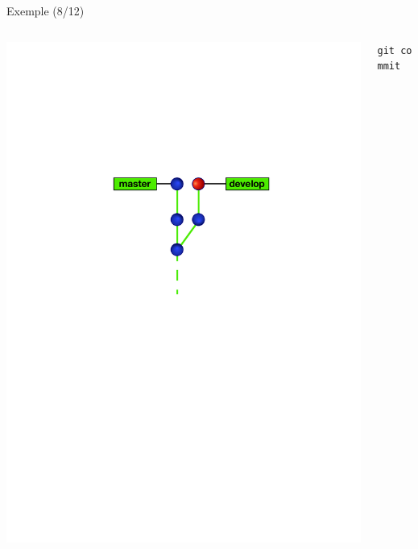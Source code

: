 \begin{frame}[fragile]{%
\protect\hypertarget{exemple-812}{%
Exemple (8/12)}}

\begin{columns}[T]
\begin{column}{0.40\textwidth}
\includegraphics[width=1\textwidth]{images/branch8.pdf}
\end{column}

\begin{column}{0.60\textwidth}
\texttt{git\ commit}
\end{column}
\end{columns}

\end{frame}

